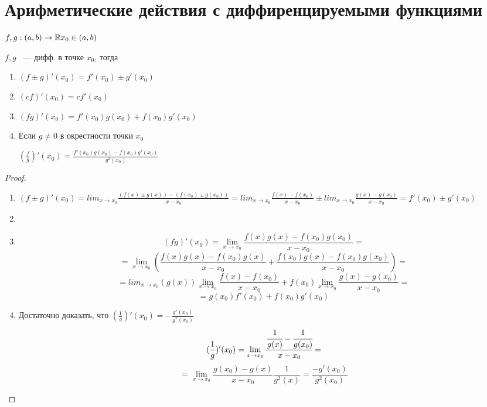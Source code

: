 ﻿\section{Арифметические действия с диффиренцируемыми функциями}

\begin{theorem}{}

$f, g:(a, b) \to \mathbb{R} x_0 \in(a, b)$

$f, g$ ~--- дифф. в точке $x_0$, тогда

\begin{enumerate}
    \item $(f\pm g)'(x_0) = f'(x_0) \pm g'(x_0)$
    \item $(cf)'(x_0) = cf'(x_0)$
    \item $(fg)'(x_0) = f'(x_0)g(x_0) + f(x_0)g'(x_0)$
    \item Если $g \ne 0$ в окрестности точки  $x_0$

    $(\frac{f}{g})'(x_0) = \frac{f'(x_0)g(x_0) - f(x_0)g'(x_0)}{g^2(x_0)}$  
\end{enumerate}
\end{theorem}

\begin{proof}
\begin{enumerate}
    \item $(f \pm g)'(x_0) = lim_{x \to x_0}\frac{(f(x) \pm g(x)) - (f(x_0) \pm g(x_0))}{x - x_0}
     = lim_{x \to x_0} \frac{f(x) - f(x_0)}{x - x_0} \pm lim_{x \to x_0} \frac{g(x) - g(x_0)}{x - x_0} = f'(x_0) \pm g'(x_0)$
    \item 
    \item $$(fg)'(x_0) = \lim_{x \to x_0}\frac{f(x)g(x) - f(x_0)g(x_0)}{x - x_0} = $$
    $$ = \lim_{x \to x_0} (\frac{f(x)g(x) - f(x_0)g(x)}{x - x_0} + \frac{f(x_0)g(x) - f(x_0)g(x_0)}{x - x_0}) =$$
    $$= lim_{x \to x_0}(g(x)) \lim_{x \to x_0}{\frac{f(x) - f(x_0)}{x - x_0}} + f(x_0)\lim_{x \to x_0}{\frac{g(x) - g(x_0)}{x - x_0}} = $$
    $$= g(x_0)f'(x_0) + f(x_0)g'(x_0)$$
    \item Достаточно доказать, что $(\frac1g)'(x_0) = -\frac{g'(x_0)}{g^2(x_0)}$
    $$(\frac{1}{g})'(x_0) = \lim_{x \to x_0}\cfrac{\cfrac{1}{g(x)} - \cfrac{1}{g(x_0)}}{x - x_0} = $$
    $$=\lim_{x \to x_0}\frac{g(x_0) - g(x)}{x - x_0}\frac{1}{g^2(x)} = \frac{-g'(x_0)}{g^2(x_0)} $$ 
\end{enumerate}
\end{proof}